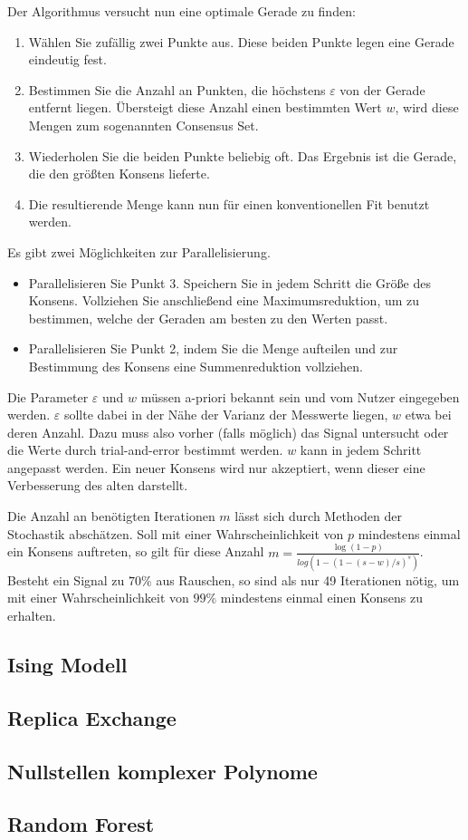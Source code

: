 \documentclass[headsepline=3pt,headinclude=true,12pt,oneside]{scrartcl}
\begin{document}
			Der Algorithmus versucht nun eine optimale Gerade zu finden:
			\begin{enumerate}
				\item Wählen Sie zufällig zwei Punkte aus. Diese beiden Punkte legen eine Gerade eindeutig fest.
				\item Bestimmen Sie die Anzahl an Punkten, die höchstens $\varepsilon$ von der Gerade entfernt liegen. Übersteigt diese Anzahl einen bestimmten Wert $w$, wird diese Mengen zum sogenannten Consensus Set.
				\item Wiederholen Sie die beiden Punkte beliebig oft. Das Ergebnis ist die Gerade, die den größten Konsens lieferte.
				
				\item Die resultierende Menge kann nun für einen konventionellen Fit benutzt werden.
			\end{enumerate}			 
			
			Es gibt zwei Möglichkeiten zur Parallelisierung.
			
			\begin{itemize}
				\item Parallelisieren Sie Punkt 3. Speichern Sie in jedem Schritt die Größe des Konsens. Vollziehen Sie anschließend eine Maximumsreduktion, um zu bestimmen, welche der Geraden am besten zu den Werten passt.
				\item Parallelisieren Sie Punkt 2, indem Sie die Menge aufteilen und zur Bestimmung des Konsens eine Summenreduktion vollziehen. 
			\end{itemize}			 
			
			Die Parameter $\varepsilon$ und $w$ müssen a-priori bekannt sein und vom Nutzer eingegeben werden. $\varepsilon$ sollte dabei in der Nähe der Varianz der Messwerte liegen, $w$ etwa bei deren Anzahl. Dazu muss also vorher (falls möglich) das Signal untersucht oder die Werte durch trial-and-error bestimmt werden. $w$ kann in jedem Schritt angepasst werden. Ein neuer Konsens wird nur akzeptiert, wenn dieser eine Verbesserung des alten darstellt. 
			
			Die Anzahl an benötigten Iterationen $m$ lässt sich durch Methoden der Stochastik abschätzen. Soll mit einer Wahrscheinlichkeit von $p$ mindestens einmal ein Konsens auftreten, so gilt für diese Anzahl $m = \frac{\log(1-p)}{log(1-(1-(s-w)/s)^s)}$. Besteht ein Signal zu $70\%$ aus Rauschen, so sind als nur 49 Iterationen nötig, um mit einer Wahrscheinlichkeit von $99\%$ mindestens einmal einen Konsens zu erhalten.

			\subsection{Ising Modell}
			\subsection{Replica Exchange}
			\subsection{Nullstellen komplexer Polynome}
			\subsection{Random Forest}
		
\end{document}
